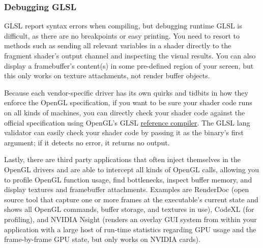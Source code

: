 \documentclass[8pt, table, xcdraw]{article}%
\begin{document}
\subsubsection{Debugging GLSL}

GLSL report syntax errors when compiling, but debugging runtime GLSL is difficult, as there are no breakpoints or easy printing. You need to resort to methods such as sending all relevant variables in a shader directly to the fragment shader's output channel and inspecting the visual results. You can also display a framebuffer's content(s) in some pre-defined region of your screen, but this only works on texture attachments, not render buffer objects.

Because each vendor-specific driver has its own quirks and tidbits in how they enforce the OpenGL specification, if you want to be sure your shader code runs on all kinds of machines, you can directly check your shader code against the official specification using OpenGL's GLSL \href{https://www.khronos.org/opengles/sdk/tools/Reference-Compiler/}{reference compiler}. The GLSL lang validator can easily check your shader code by passing it as the binary's first argument; if it detects no error, it returns no output.

Lastly, there are third party applications that often inject themselves in the OpenGL drivers and are able to intercept all kinds of OpenGL calls, allowing you to profile OpenGL function usage, find bottlenecks, inspect buffer memory, and display textures and framebuffer attachments. Examples are RenderDoc (open source tool that capture one or more frames at the executable's current state and shows all OpenGL commands, buffer storage, and textures in use), CodeXL (for profiling), and NVIDIA Nsight (renders an overlay GUI system from within your application with a large host of run-time statistics regarding GPU usage and the frame-by-frame GPU state, but only works on NVIDIA cards).
\end{document}
